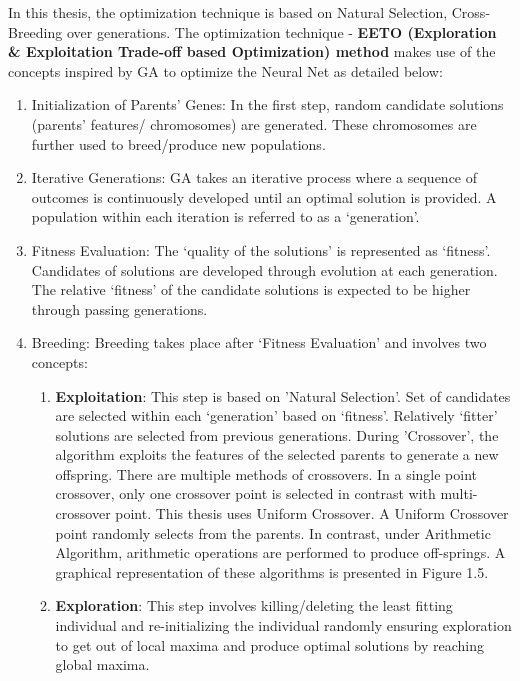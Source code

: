 In this thesis, the optimization technique is based on Natural Selection, Cross-Breeding over generations. The optimization technique - \textbf{EETO (Exploration \& Exploitation Trade-off based Optimization) method} makes use of the concepts inspired by GA to optimize the Neural Net as detailed below:

\begin{enumerate}
	\item Initialization of Parents' Genes: In the first step, random candidate solutions (parents' features/ chromosomes) are generated. These chromosomes are further used to breed/produce new populations.
	\item Iterative Generations: GA takes an iterative process where a sequence of outcomes is continuously developed until an optimal solution is provided. A population within each iteration is referred to as a ‘generation’.
	\item Fitness Evaluation: The ‘quality of the solutions’ is represented as ‘fitness’. Candidates of solutions are developed through evolution at each generation. The relative ‘fitness’ of the candidate solutions is expected to be higher through passing generations.
	\item Breeding: Breeding takes place after ‘Fitness Evaluation' and involves two concepts:
	\begin{enumerate}
		\item \textbf{Exploitation}: This step is based on 'Natural Selection'. Set of candidates are selected within each ‘generation’ based on ‘fitness’. Relatively ‘fitter’ solutions are selected from previous generations. During 'Crossover', the algorithm exploits the features of the selected parents to generate a new offspring. There are multiple methods of crossovers. In a single point crossover, only one crossover point is selected in contrast with multi-crossover point. This thesis uses Uniform Crossover. A Uniform Crossover point randomly selects from the parents. In contrast, under Arithmetic Algorithm, arithmetic operations are performed to produce off-springs. A graphical representation of these algorithms is presented in Figure 1.5.
		\item  \textbf{Exploration}: This step involves killing/deleting the least fitting individual and re-initializing the individual randomly ensuring exploration to get out of local maxima and produce optimal solutions by reaching global maxima. 
	\end{enumerate} 


\end{enumerate}
